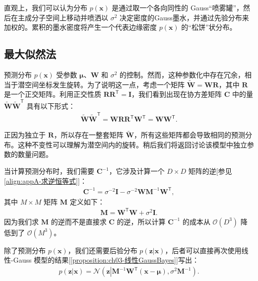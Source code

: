 \documentclass[../../main.tex]{subfiles}
\begin{document}
直观上，我们可以认为分布 $p(\bm{x})$ 是通过取一个各向同性的 Gauss“喷雾罐”，然后在主成分子空间上移动并喷洒以 $\sigma^2$ 决定密度的Gauss墨水，并通过先验分布来加权的。累积的墨水密度将产生一个代表边缘密度 $p(\bm{x})$ 的“松饼”状分布。

\subsection{最大似然法}\label{subsection:ch16-最大似然法}

预测分布 $p(\bm{x})$ 受参数 $\bm{\mu}$、$\bm{W}$ 和 $\sigma^2$ 的控制。然而，这种参数化中存在冗余，相当于潜空间坐标发生旋转。为了说明这一点，考虑一个矩阵 $\widetilde{\bm{W}}=\bm{W}\bm{R}$，其中 $\bm{R}$ 是一个正交矩阵。利用正交性质 $\bm{R}\bm{R}^{\mathsf T}=\bm{I}$，我们看到出现在协方差矩阵 $\bm{C}$ 中的量 $\widetilde{\bm{W}}\widetilde{\bm{W}}^{\mathsf T}$ 具有以下形式：
\begin{align}
  \widetilde{\bm{W}}\widetilde{\bm{W}}^{\mathsf T}=\bm{W}\bm{R}\bm{R}^{\mathsf T}\bm{W}^{\mathsf T}=\bm{W}\bm{W}^{\mathsf T}.
  \label{align:ch16-旋转不变}
\end{align}

正因为独立于 $\bm{R}$，所以存在一整套矩阵 $\widetilde{\bm{W}}$，所有这些矩阵都会导致相同的预测分布。这种不变性可以理解为潜空间内的旋转。稍后我们将返回讨论该模型中独立参数的数量问题。

当计算预测分布时，我们需要 $\bm{C}^{-1}$，它涉及计算一个 $D\times D$ 矩阵的逆[参见\eqref{align:appA-求逆恒等式}]：
\begin{align}
  \bm{C}^{-1}=\sigma^{-2}\bm{I}-\sigma^{-2}\bm{W}\bm{M}^{-1}\bm{W}^{\mathsf T},
  \label{align:ch16-协方差逆}
\end{align}
其中 $M\times M$ 矩阵 $\bm{M}$ 定义如下：
\begin{align}
  \bm{M}=\bm{W}^{\mathsf T}\bm{W}+\sigma^2\bm{I}.
  \label{align:ch16-矩阵M}
\end{align}
因为我们求 $\bm{M}$ 的逆而不是直接求 $\bm{C}$ 的逆，所以计算 $\bm{C}^{-1}$ 的成本从 $\mathcal{O}(D^3)$ 降低到了 $\mathcal{O}(M^3)$。

除了预测分布 $p(\bm{x})$，我们还需要后验分布 $p(\bm{z}|\bm{x})$，后者可以直接再次使用线性-Gauss 模型的结果[\cref{proposition:ch03-线性GaussBayes}]写出：
\begin{align}
  p(\bm{z}|\bm{x})=\mathcal{N}\left(\bm{z}\left|\bm{M}^{-1}\bm{W}^{\mathsf T}(\bm{x}-\bm{\mu}),\sigma^2\bm{M}^{-1}\right.\right).
  \label{align:ch16-后验}
\end{align}
\end{document}
